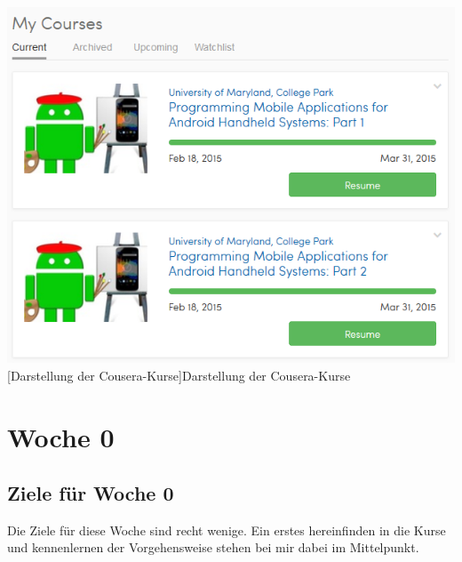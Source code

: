 \documentclass[12pt,a4paper,bibliography=totocnumbered,listof=totocnumbered]{scrartcl}
\begin{document}
\vspace{1em}
\begin{minipage}{\linewidth}
	\centering
	\includegraphics[width=0.7\linewidth]{Bilder/overview.png}
	[Darstellung der Cousera-Kurse]{Darstellung der Cousera-Kurse\footnotemark }
	\label{fig:osgi}
\end{minipage}

\pagebreak

\section{Woche 0}

\subsection{Ziele für Woche 0}
Die Ziele für diese Woche sind recht wenige. Ein erstes hereinfinden in die Kurse und kennenlernen der Vorgehensweise stehen bei mir dabei im Mittelpunkt.
\end{document}

